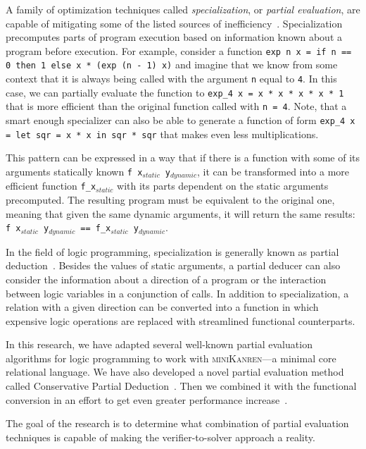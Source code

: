 \documentclass[crop=false]{standalone}
\begin{document}
A family of optimization techniques called \emph{specialization}, or \emph{partial evaluation}, are capable of mitigating some of the listed sources of inefficiency~\cite{de1999conjunctive,verbitskaia2021empirical}. 
Specialization precomputes parts of program execution based on information known about a program before execution. 
For example, consider a function \texttt{exp n x = if n == 0 then 1 else x * (exp (n - 1) x)} and imagine that we know from some context that it is always being called with the argument \texttt{n} equal to  \texttt{4}. 
In this case, we can partially evaluate the function to \texttt{exp\_4 x = x * x * x * x * 1} that is more efficient than the original function called with \texttt{n = 4}. 
Note, that a smart enough specializer can also be able to generate a function of form \texttt{exp\_4 x = let sqr = x * x in sqr * sqr} that makes even less multiplications. 

This pattern can be expressed in a way that if there is a function with some of its arguments statically known \texttt{f x$_{static}$ y$_{dynamic}$}, it can be transformed into a more efficient function \texttt{f\_x$_{static}$} with its parts dependent on the static arguments precomputed.
The resulting program must be equivalent to the original one, meaning that given the same dynamic arguments, it will return the same results: \texttt{f x$_{static}$ y$_{dynamic}$ == f\_x$_{static}$ y$_{dynamic}$}.

In the field of logic programming, specialization is generally known as partial deduction~\cite{komorowski1992introduction}. 
Besides the values of static arguments, a partial deducer can also consider the information about a direction of a program or the interaction between logic variables in a conjunction of calls. 
In addition to specialization, a relation with a given direction can be converted into a function in which expensive logic operations are replaced with streamlined functional counterparts. 


In this research, we have adapted several well-known partial evaluation algorithms for logic programming to work with \textsc{miniKanren}---a minimal core relational language. 
We have also developed a novel partial evaluation method called Conservative Partial Deduction~\cite{verbitskaia2021empirical}.
Then we combined it with the functional conversion in an effort to get even greater performance increase~\cite{verbitskaia2024case}. 

The goal of the research is to determine what combination of partial evaluation techniques is capable of making the verifier-to-solver approach a reality. 
\end{document}
